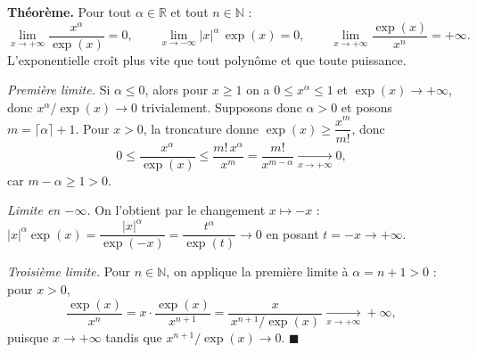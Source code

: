 
\begin{tcolorbox}[thmbox]
  \textbf{Théorème.}\enspace%
  Pour tout $\alpha \in \mathbb{R}$ et tout $n \in \mathbb{N}$ :
  \[
    \lim_{x\to+\infty} \frac{x^\alpha}{\exp(x)} = 0, \qquad
    \lim_{x\to-\infty} |x|^\alpha\,\exp(x) = 0, \qquad
    \lim_{x\to+\infty} \frac{\exp(x)}{x^n} = +\infty.
  \]
  L'exponentielle croît plus vite que tout polynôme et que toute puissance.
\end{tcolorbox}

\begin{mdframed}[style=proofbar]
  \textit{Première limite.} Si $\alpha \leq 0$, alors pour $x \geq 1$ on a
  $0 \leq x^\alpha \leq 1$ et $\exp(x) \to +\infty$, donc
  $x^\alpha/\exp(x) \to 0$ trivialement. Supposons donc $\alpha > 0$ et
  posons $m = \lceil\alpha\rceil + 1$. Pour $x > 0$, la troncature donne
  $\exp(x) \geq \dfrac{x^m}{m!}$, donc
  \[
    0 \leq \frac{x^\alpha}{\exp(x)} \leq \frac{m!\,x^\alpha}{x^m}
    = \frac{m!}{x^{m-\alpha}} \xrightarrow[x\to+\infty]{} 0,
  \]
  car $m - \alpha \geq 1 > 0$.

  \textit{Limite en $-\infty$.} On l'obtient par le changement $x \mapsto -x$ :
  $|x|^\alpha\exp(x) = \dfrac{|x|^\alpha}{\exp(-x)} = \dfrac{t^\alpha}{\exp(t)} \to 0$
  en posant $t = -x \to +\infty$.

  \textit{Troisième limite.} Pour $n \in \mathbb{N}$, on applique la première
  limite à $\alpha = n+1 > 0$ : pour $x > 0$,
  \[
    \frac{\exp(x)}{x^n} = x \cdot \frac{\exp(x)}{x^{n+1}}
    = \frac{x}{\,x^{n+1}/\exp(x)\,} \xrightarrow[x\to+\infty]{} +\infty,
  \]
  puisque $x \to +\infty$ tandis que $x^{n+1}/\exp(x) \to 0$.
  \hfill$\blacksquare$
\end{mdframed}

\decsep{}



